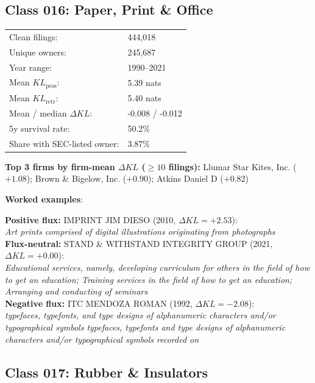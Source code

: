 \subsection*{Class 016: Paper, Print \& Office}
\label{app:industry-016}

\begin{tabular}{ll}
Clean filings: & 444,018 \\
Unique owners: & 245,687 \\
Year range: & 1990--2021 \\
Mean $KL_\text{pros}$: & 5.39 nats \\
Mean $KL_\text{retr}$: & 5.40 nats \\
Mean / median $\Delta KL$: & -0.008 / -0.012 \\
5y survival rate: & 50.2\% \\
Share with SEC-listed owner: & 3.87\% \\
\end{tabular}

\textbf{Top 3 firms by firm-mean $\Delta KL$ ($\geq 10$ filings):} Llumar Star Kites, Inc. ($+1.08$); Brown \& Bigelow, Inc. ($+0.90$); Atkins Daniel D ($+0.82$)

\textbf{Worked examples}:

  \textbf{Positive flux:} \textsc{IMPRINT JIM DIESO} (2010, $\Delta KL=+2.53$):\\
  \textit{Art prints comprised of digital illustrations originating from photographs}\\
  \textbf{Flux-neutral:} \textsc{STAND \& WITHSTAND INTEGRITY GROUP} (2021, $\Delta KL=+0.00$):\\
  \textit{Educational services, namely, developing curriculum for others in the field of how to get an education; Training services in the field of how to get an education; Arranging and conducting of seminars }\\
  \textbf{Negative flux:} \textsc{ITC MENDOZA ROMAN} (1992, $\Delta KL=-2.08$):\\
  \textit{typefaces, typefonts, and type designs of alphanumeric characters and/or typographical symbols typefaces, typefonts and type designs of alphanumeric characters and/or typographical symbols recorded on}\\

\subsection*{Class 017: Rubber \& Insulators}
\label{app:industry-017}

